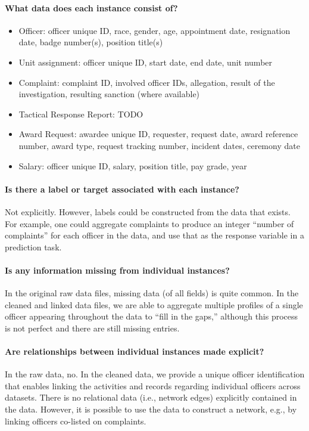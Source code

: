 \paragraph{What data does each instance consist of?}
\begin{itemize}
\item Officer: officer unique ID, race, gender, age, appointment date, resignation date, badge number(s), position title(s)
\item Unit assignment: officer unique ID, start date, end date, unit number
\item Complaint: complaint ID, involved officer IDs, allegation, result of the investigation, resulting sanction (where available)
\item Tactical Response Report: {\color{red} TODO}
\item Award Request: awardee unique ID, requester, request date, award reference number, award type, request tracking number, incident dates, ceremony date
\item Salary: officer unique ID, salary, position title, pay grade, year
\end{itemize}

\paragraph{Is there a label or target associated with each instance?}
Not explicitly. However, labels could be constructed from the data 
that exists. For example, one could aggregate complaints to produce
an integer ``number of complaints'' for each officer in the data,
and use that as the response variable in a prediction task.

\paragraph{Is any information missing from individual instances?}
In the original raw data files, missing data (of all fields) is quite common.
In the cleaned and linked data files, we are able to aggregate multiple profiles
of a single officer appearing throughout the data to ``fill in the gaps,'' although
this process is not perfect and there are still missing entries.

\paragraph{Are relationships between individual instances made explicit?}
In the raw data, no. In the cleaned data, we provide a unique officer
identification that enables linking the activities and records regarding
individual officers across datasets. There is no relational data (i.e., network edges)
explicitly contained in the data. However, it is possible to use the data
to construct a network, e.g., by linking officers co-listed on complaints.

